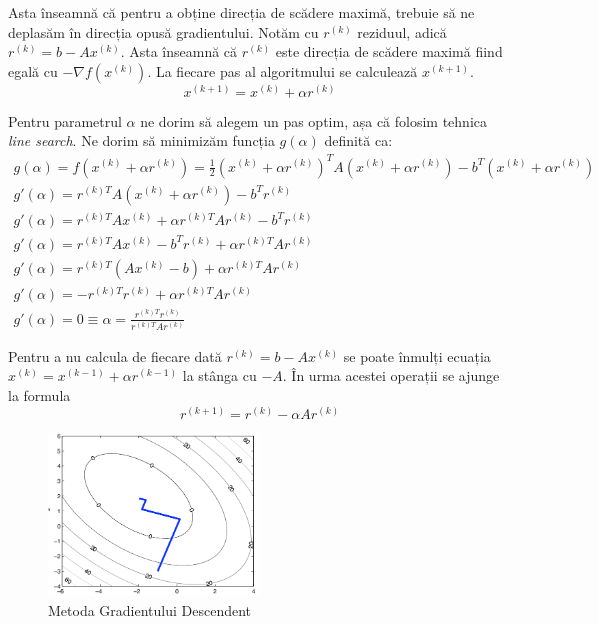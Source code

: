\documentclass{exam}
\begin{document}
Asta înseamnă că pentru a obține direcția de scădere maximă, trebuie să ne
deplasăm în direcția opusă gradientului. Notăm cu $r^{(k)}$ reziduul, adică
$r^{(k)} = b - Ax^{(k)}$. Asta înseamnă că $r^{(k)}$ este direcția de scădere
maximă fiind egală cu $-\nabla f(x^{(k)})$. La fiecare pas al algoritmului se
calculează $x^{(k + 1)}$.
\begin{equation*}
	x^{(k + 1)} = x^{(k)} + \alpha r^{(k)}
\end{equation*}

Pentru parametrul $\alpha$ ne dorim să alegem un pas optim, așa că folosim
tehnica \textit{line search}. Ne dorim să minimizăm funcția $g(\alpha)$ definită
ca:
\begin{gather*}
	g(\alpha) = f(x^{(k)} + \alpha r^{(k)}) = \frac{1}{2} (x^{(k)} + \alpha r^{(k)})^T A (x^{(k)} + \alpha r^{(k)}) - b^T (x^{(k)} + \alpha r^{(k)}) \\
	g'(\alpha) = r^{(k)T} A (x^{(k)} + \alpha r^{(k)}) - b^T r^{(k)} \\
	g'(\alpha) = r^{(k)T} A x^{(k)} + \alpha r^{(k)T} A r^{(k)} - b^T r^{(k)} \\
	g'(\alpha) = r^{(k)T} A x^{(k)} - b^T r^{(k)} + \alpha r^{(k)T} A r^{(k)} \\
	g'(\alpha) = r^{(k)T} (Ax^{(k)} - b) + \alpha r^{(k)T} A r^{(k)} \\
	g'(\alpha) = -r^{(k)T} r^{(k)} + \alpha r^{(k)T} A r^{(k)} \\
	g'(\alpha) = 0 \equiv \alpha = \frac{r^{(k)T} r^{(k)}}{r^{(k)T} A r^{(k)}}
\end{gather*}

Pentru a nu calcula de fiecare dată $r^{(k)} = b - Ax^{(k)}$ se poate înmulți ecuația $x^{(k)} = x^{(k-1)} + \alpha r^{(k-1)}$ la stânga cu $-A$. În urma acestei operații se ajunge la formula $$r^{(k+1)} = r^{(k)} - \alpha Ar^{(k)}$$

\begin{figure}[ht]
	\centering
	\includegraphics[width=0.5\textwidth]{steepest_descent.png}
	\caption{Metoda Gradientului Descendent}
	\label{fig:1}
\end{figure}
\end{document}
